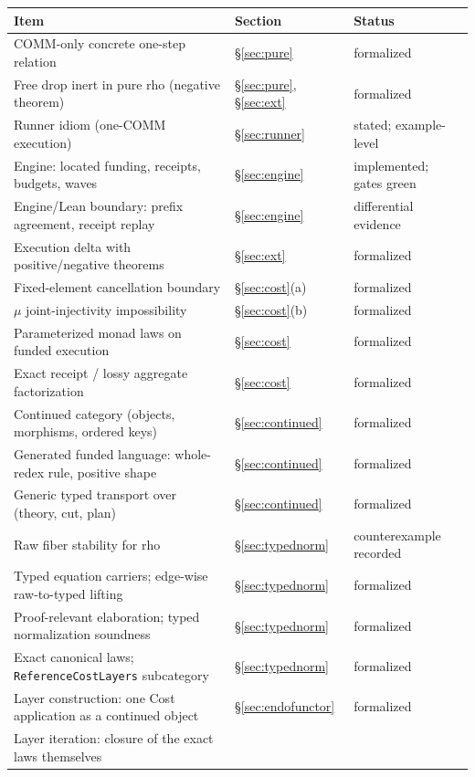 \documentclass[11pt]{article}
\newcommand{\code}[1]{\texttt{#1}}
\begin{document}
\begin{center}
\begin{tabularx}{\textwidth}{@{}Xll@{}}
\toprule
Item & Section & Status \\
\midrule
COMM-only concrete one-step relation & \S\ref{sec:pure} & formalized \\
Free drop inert in pure rho (negative theorem) &
  \S\ref{sec:pure}, \S\ref{sec:ext} & formalized \\
Runner idiom (one-COMM execution) & \S\ref{sec:runner} &
  stated; example-level \\
Engine: located funding, receipts, budgets, waves & \S\ref{sec:engine} &
  implemented; gates green \\
Engine/Lean boundary: prefix agreement, receipt replay &
  \S\ref{sec:engine} & differential evidence \\
Execution delta with positive/negative theorems & \S\ref{sec:ext} &
  formalized \\
Fixed-element cancellation boundary & \S\ref{sec:cost}(a) & formalized \\
$\mu$ joint-injectivity impossibility & \S\ref{sec:cost}(b) & formalized \\
Parameterized monad laws on funded execution & \S\ref{sec:cost} &
  formalized \\
Exact receipt / lossy aggregate factorization & \S\ref{sec:cost} &
  formalized \\
Continued category (objects, morphisms, ordered keys) &
  \S\ref{sec:continued} & formalized \\
Generated funded language: whole-redex rule, positive shape &
  \S\ref{sec:continued} & formalized \\
Generic typed transport over (theory, cut, plan) & \S\ref{sec:continued} &
  formalized \\
Raw fiber stability for rho & \S\ref{sec:typednorm} &
  counterexample recorded \\
Typed equation carriers; edge-wise raw-to-typed lifting &
  \S\ref{sec:typednorm} & formalized \\
Proof-relevant elaboration; typed normalization soundness &
  \S\ref{sec:typednorm} & formalized \\
Exact canonical laws; \code{ReferenceCostLayers} subcategory &
  \S\ref{sec:typednorm} & formalized \\
Layer construction: one Cost application as a continued object &
  \S\ref{sec:endofunctor} & formalized \\
Layer iteration: closure of the exact laws themselves &

\end{tabularx}
\end{center}
\end{document}
